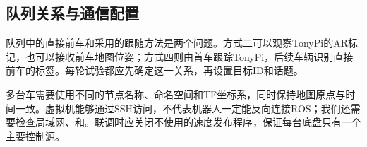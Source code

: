\subsection{队列关系与通信配置}
队列中的直接前车和采用的跟随方法是两个问题。方式二可以观察TonyPi的AR标记，也可以接收前车地图位姿；方式四则由首车跟踪TonyPi，后续车辆识别直接前车的标签。每轮试验都应先确定这一关系，再设置目标ID和话题。

多台车需要使用不同的节点名称、命名空间和TF坐标系，同时保持地图原点与时间一致。虚拟机能够通过SSH访问，不代表机器人一定能反向连接ROS；我们还需要检查局域网、和。联调时应关闭不使用的速度发布程序，保证每台底盘只有一个主要控制源。
